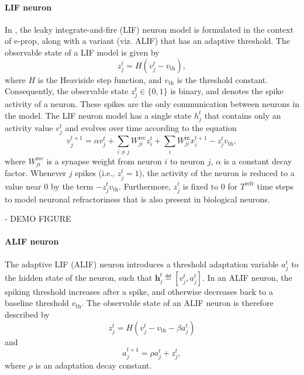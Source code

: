         \paragraph{LIF neuron}
        In \cite{bellec2020solution}, the leaky integrate-and-fire (LIF) neuron model is formulated in the context of e-prop, along with a variant (viz. ALIF) that has an adaptive threshold. 
        The observable state of a LIF model is given by
        \begin{equation}
        z^t_j = H\left(v_j^t-v_\text{th}\right),
        \end{equation}
        where $H$ is the Heaviside step function, and $v_\text{th}$ is the threshold constant.
        Consequently, the observable state $z^t_j \in \{0, 1\}$ is binary, and denotes the spike activity of a neuron.
        These spikes are the only communication between neurons in the model.
        The LIF neuron model has a single state $h^t_j$ that contains only an activity value $v^t_j$ and evolves over time according to the equation
        \begin{equation}\label{eq:alifV}
        v^{t+1}_j = \alpha v_j^t + \sum_{i\neq j}W^\text{rec}_{ji}z_i^t + \sum_i W^\text{in}_{ji}x_i^{t+1} - z_j^tv_
        \text{th},
        \end{equation}
        where $W^\text{rec}_{ji}$ is a synapse weight from neuron $i$ to neuron $j$, $\alpha$ is a constant decay factor.
        Whenever $j$ spikes (i.e., $z_j^t = 1$), the activity of the neuron is reduced to a value near 0 by the term $-z^t_jv_\text{th}$.
        Furthermore, $z^t_j$ is fixed to 0 for $T^\text{refr}$ time steps to model neuronal refractoriness that is also present in biological neurons.
        \begin{tcolorbox}[colback=orange]
        - DEMO FIGURE

        \end{tcolorbox}

        \paragraph{ALIF neuron}
        The adaptive LIF (ALIF) neuron introduces a threshold adaptation variable $a^t_j$ to the hidden state of the neuron, such that $\mathbf{h}^t_j \eqdef \left[v^t_j, a^t_j\right]$.
        In an ALIF neuron, the spiking threshold increases after a spike, and otherwise decreases back to a baseline threshold $v_\text{th}$.
        The observable state of an ALIF neuron is therefore described by
        \begin{equation}\label{eq:alifZ}
        z^t_j = H\left(v_j^t - v_\text{th} - \beta a^t_j\right)
        \end{equation}
        and
        \begin{equation}\label{eq:alifA}
        a^{t+1}_j = \rho a^t_j + z^t_j,
        \end{equation}
        where $\rho$ is an adaptation decay constant.


